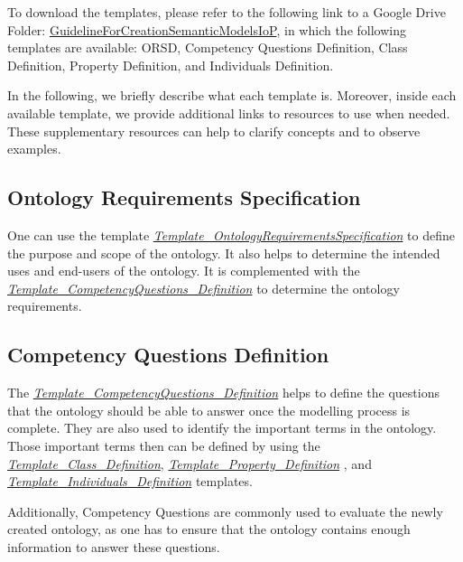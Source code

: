 \documentclass{guideline/sty/rapport}
\begin{document}
To download the templates, please refer to the following link to a Google Drive Folder: \href{https://drive.google.com/drive/folders/1xwtJYaNQIGd1TWdWayciCiH5wcpnSDxw?usp=sharing}{GuidelineForCreationSemanticModelsIoP}, in which the following templates are available: \ac{ORSD}, Competency Questions Definition, Class Definition, Property Definition, and Individuals Definition. \singlespacing

In the following, we briefly describe what each template is. Moreover, inside each available template, we provide additional links to resources to use when needed. These supplementary resources can help to clarify concepts and to observe examples. 

\subsection{Ontology Requirements Specification}
One can use the template \href{https://docs.google.com/document/d/1mkHccxvvGbj3omXubZ_EbM_l7m8LfalJ/edit}{\textit{Template\_OntologyRequirementsSpecification}} to define the purpose and scope of the ontology. It also helps to determine the intended uses and end-users of the ontology. It is complemented with the \href{https://docs.google.com/spreadsheets/d/1UwT7DnW3pIkDKmfn1jgONsp2BbiQZ4mJeeg0lOBV0DQ/edit#gid=0}{\textit{Template\_CompetencyQuestions\_Definition}} to determine the ontology requirements.

\subsection{Competency Questions Definition}
The \href{https://docs.google.com/spreadsheets/d/1UwT7DnW3pIkDKmfn1jgONsp2BbiQZ4mJeeg0lOBV0DQ/edit#gid=0}{\textit{Template\_CompetencyQuestions\_Definition}} helps to define the questions that the ontology should be able to answer once the modelling process is complete. They are also used to identify the important terms in the ontology. Those important terms then can be defined by using the \href{https://docs.google.com/spreadsheets/d/16g3pAnE-fzbQydI0m5zkswAc83r881oBgKarQaCkGa0/edit#gid=0}{\textit{Template\_Class\_Definition}}, \href{https://docs.google.com/spreadsheets/d/1pmVIaY3WwofKMBwXdqbiCgXH5DL4rNx-ZhKlHUdZoRo/edit#gid=0}{\textit{Template\_Property\_Definition}} , and \href{https://docs.google.com/spreadsheets/d/11_twMjg6mwAQoefg4pRDqZCcsNCKwbrflg0NIkcyF1I/edit#gid=0}{\textit{Template\_Individuals\_Definition}} templates. \singlespacing

Additionally, Competency Questions are commonly used to evaluate the newly created ontology, as one has to ensure that the ontology contains enough information to answer these questions.
\end{document}

